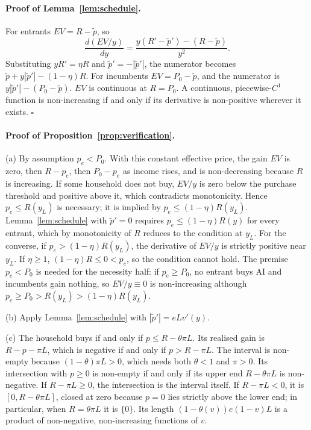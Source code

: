 \documentclass[12pt]{article}
\theoremstyle{remark}
\begin{document}
\paragraph{Proof of Lemma~\ref{lem:schedule}.} For entrants $EV=R-\tilde p$, so
\[
\frac{d(EV/y)}{dy}=\frac{y(R'-\tilde p')-(R-\tilde p)}{y^2}.
\]
Substituting $yR'=\eta R$ and $\tilde p'=-|\tilde p'|$, the numerator becomes $\tilde p+y|\tilde p'|-(1-\eta)R$. For incumbents $EV=P_0-\tilde p$, and the numerator is $y|\tilde p'|-(P_0-\tilde p)$. $EV$ is continuous at $R=P_0$. A continuous, piecewise-$C^1$ function is non-increasing if and only if its derivative is non-positive wherever it exists. $\square$

\paragraph{Proof of Proposition~\ref{prop:verification}.}
(a) By assumption $p_e<P_0$. With this constant effective price, the gain $EV$ is zero, then $R-p_e$, then $P_0-p_e$ as income rises, and is non-decreasing because $R$ is increasing. If some household does not buy, $EV/y$ is zero below the purchase threshold and positive above it, which contradicts monotonicity. Hence $p_e\le R(y_L)$ is necessary; it is implied by $p_e\le(1-\eta)R(y_L)$. Lemma~\ref{lem:schedule} with $\tilde p'=0$ requires $p_e\le(1-\eta)R(y)$ for every entrant, which by monotonicity of $R$ reduces to the condition at $y_L$. For the converse, if $p_e>(1-\eta)R(y_L)$, the derivative of $EV/y$ is strictly positive near $y_L$. If $\eta\ge1$, $(1-\eta)R\le0<p_e$, so the condition cannot hold. The premise $p_e<P_0$ is needed for the necessity half: if $p_e\ge P_0$, no entrant buys AI and incumbents gain nothing, so $EV/y\equiv0$ is non-increasing although $p_e\ge P_0>R(y_L)>(1-\eta)R(y_L)$.

(b) Apply Lemma~\ref{lem:schedule} with $|\tilde p'|=eLv'(y)$.

(c) The household buys if and only if $p\le R-\theta\pi L$. Its realised gain is $R-p-\pi L$, which is negative if and only if $p>R-\pi L$. The interval is non-empty because $(1-\theta)\pi L>0$, which needs both $\theta<1$ and $\pi>0$. Its intersection with $p\ge0$ is non-empty if and only if its upper end $R-\theta\pi L$ is non-negative. If $R-\pi L\ge0$, the intersection is the interval itself. If $R-\pi L<0$, it is $[0,R-\theta\pi L]$, closed at zero because $p=0$ lies strictly above the lower end; in particular, when $R=\theta\pi L$ it is $\{0\}$. Its length $(1-\theta(v))e(1-v)L$ is a product of non-negative, non-increasing functions of $v$.
\end{document}
